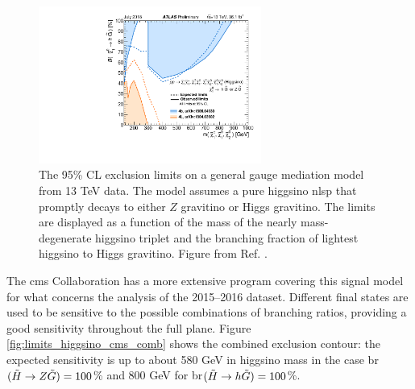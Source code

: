 \begin{figure}[htbp]
	\centering
	\includegraphics[width=0.65\textwidth]{figures/summary_plots/ATLAS_SUSY_EWSummary_GGM.pdf}
	\caption{The 95\% CL exclusion limits on a general gauge mediation model from 13 TeV data. 
	The model assumes a pure higgsino \gls{nlsp} that promptly decays to either $Z$ gravitino or Higgs gravitino. 
	The limits are displayed as a function of the mass of the nearly mass-degenerate higgsino triplet and the branching fraction of lightest higgsino to Higgs gravitino. 	Figure from Ref. \cite{atlasSUSYSummary}.
	} 
	\label{fig:summary_atlas_higgsino_GMSB}
\end{figure}

The \gls{cms} Collaboration has a more extensive program covering this signal model for what concerns the analysis of the 
2015--2016 dataset. 
Different final states are used to be sensitive to the possible combinations of branching ratios, 
providing a good sensitivity throughout the full plane.
Figure \ref{fig:limits_higgsino_cms_comb} shows the combined exclusion contour: the expected sensitivity is up to about 580 GeV 
in higgsino mass in the case \gls{br}$(\tilde{H}\rightarrow Z \tilde{G})=100$\% and 800 GeV for 
\gls{br}$(\tilde{H}\rightarrow h \tilde{G})=100$\%.


